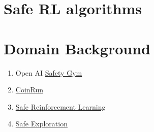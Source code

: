 \section{Safe RL algorithms}

\section{Domain Background}
\begin{enumerate}
	\item
		Open AI \href{https://openai.com/blog/safety-gym/}{Safety Gym}
	\item
	\href{https://github.com/openai/coinrun}{CoinRun }
	\item
		\href{https://paperswithcode.com/task/safe-reinforcement-learning}{Safe Reinforcement Learning}
	\item
		\href{https://paperswithcode.com/task/safe-exploration/codeless}{Safe Exploration}
\end{enumerate}
	
\def\FormatName#1{#1}

{\footnotesize}



